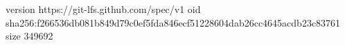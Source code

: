 version https://git-lfs.github.com/spec/v1
oid sha256:f266536db081b849d79c0ef5fda846ecf51228604dab26cc4645acdb23c83761
size 349692
